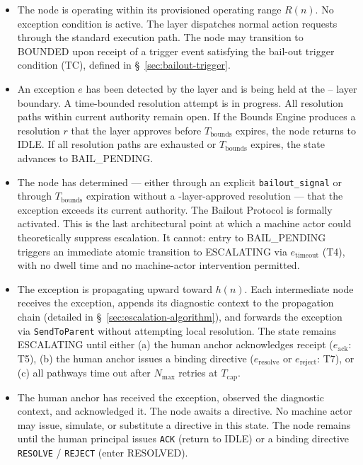 \begin{itemize}\itemsep=0pt
\item[\textbf{IDLE.}] The node is operating within its provisioned operating range $R(n)$. No exception condition is active. The \fact{} layer dispatches normal action requests through the standard execution path. The node may transition to BOUNDED upon receipt of a trigger event satisfying the bail-out trigger condition (TC), defined in \S~\ref{sec:bailout-trigger}.

\item[\textbf{BOUNDED.}] An exception $e$ has been detected by the \bounds{} layer and is being held at the \bounds{}--\fact{} layer boundary. A time-bounded resolution attempt is in progress. All resolution paths within current authority remain open. If the Bounds Engine produces a resolution $r$ that the \fact{} layer approves before $T_{\text{bounds}}$ expires, the node returns to IDLE. If all resolution paths are exhausted or $T_{\text{bounds}}$ expires, the state advances to BAIL\_PENDING.

\item[\textbf{BAIL\_PENDING.}] The node has determined — either through an explicit \texttt{bailout\_signal} or through $T_{\text{bounds}}$ expiration without a \fact-layer-approved resolution — that the exception exceeds its current authority. The Bailout Protocol is formally activated. This is the last architectural point at which a machine actor could theoretically suppress escalation. It cannot: entry to BAIL\_PENDING triggers an immediate atomic transition to ESCALATING via $e_{\text{timeout}}$ (T4), with no dwell time and no machine-actor intervention permitted.

\item[\textbf{ESCALATING.}] The exception is propagating upward toward $h(n)$. Each intermediate node receives the exception, appends its diagnostic context to the propagation chain (detailed in \S~\ref{sec:escalation-algorithm}), and forwards the exception via \texttt{SendToParent} without attempting local resolution. The state remains ESCALATING until either (a) the human anchor acknowledges receipt ($e_{\text{ack}}$: T5), (b) the human anchor issues a binding directive ($e_{\text{resolve}}$ or $e_{\text{reject}}$: T7), or (c) all pathways time out after $N_{\max}$ retries at $T_{\text{cap}}$.

\item[\textbf{HUMAN\_ACKNOWLEDGED.}] The human anchor has received the exception, observed the diagnostic context, and acknowledged it. The node awaits a directive. No machine actor may issue, simulate, or substitute a directive in this state. The node remains until the human principal issues \texttt{ACK} (return to IDLE) or a binding directive \texttt{RESOLVE} / \texttt{REJECT} (enter RESOLVED).


\end{itemize}

